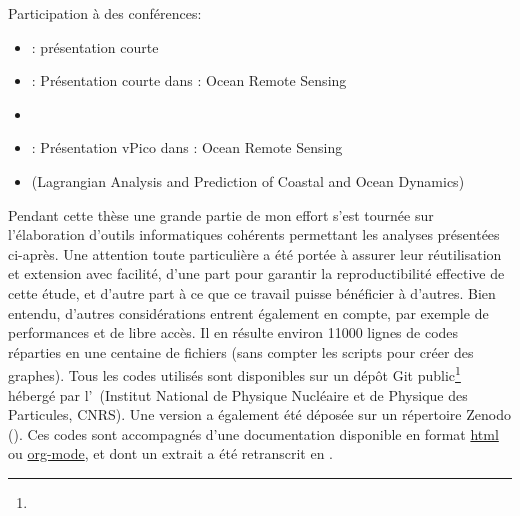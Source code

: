 \bigskip

Participation à des conférences:
\begin{itemize}
  \item {}: présentation courte
  \item {}: Présentation courte dans : Ocean Remote Sensing
  \item {}
  \item {}: Présentation vPico dans : Ocean Remote Sensing
  \item {} (Lagrangian Analysis and Prediction of Coastal and Ocean Dynamics)
\end{itemize}

\newpage

Pendant cette thèse une grande partie de mon effort s'est tournée sur l'élaboration d'outils informatiques cohérents  permettant les analyses présentées ci-après.
Une attention toute particulière a été portée à assurer leur réutilisation et extension avec facilité, d'une part pour garantir la reproductibilité effective de cette étude, et d'autre part à ce que ce travail puisse bénéficier à d'autres.
Bien entendu, d'autres considérations entrent également en compte, par exemple de performances et de libre accès.
Il en résulte environ \num{11000} lignes de codes réparties en une centaine de fichiers (sans compter les scripts pour créer des graphes).
Tous les codes utilisés sont disponibles sur un dépôt Git public\footnote{} hébergé par l'~(Institut National de Physique Nucléaire et de Physique des Particules, CNRS).
Une version a également été déposée sur un répertoire Zenodo (\hbox{}).
Ces codes sont accompagnés d'une documentation disponible en format \href{https://clementhaeck.pages.in2p3.fr/submeso-color/}{\textsf{html}} ou \href{https://gitlab.in2p3.fr/clementhaeck/submeso-color/-/blob/develop/docs/index.org}{\textsf{org-mode}}, et dont un extrait a été retranscrit en .


